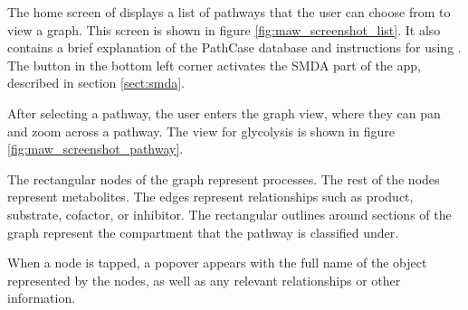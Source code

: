 The home screen of \mawapp displays a list of pathways that the user can
choose from to view a graph. This screen is shown in figure
\ref{fig:maw_screenshot_list}. It also contains a brief explanation of the
PathCase database and instructions for using \mawapp. The button in the bottom
left corner activates the SMDA part of the app, described in section
\ref{sect:smda}.

After selecting a pathway, the user enters the graph view, where they can pan
and zoom across a pathway. The view for glycolysis is shown in figure
\ref{fig:maw_screenshot_pathway}.

The rectangular nodes of the graph represent processes. The rest of the nodes
represent metabolites. The edges represent relationships such as product,
substrate, cofactor, or inhibitor. The rectangular outlines around sections of
the graph represent the compartment that the pathway is classified under.

When a node is tapped, a popover appears with the full name of the object
represented by the nodes, as well as any relevant relationships or other
information.
